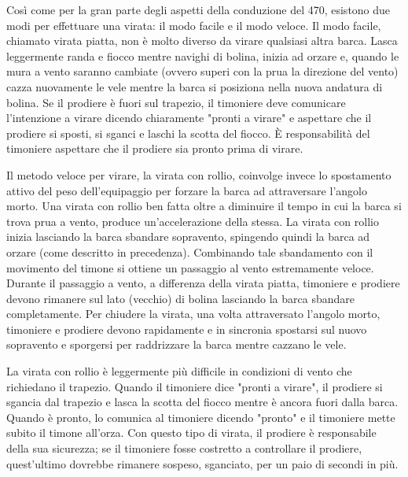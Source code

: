 Così come per la gran parte degli aspetti della conduzione del 470, esistono due
modi per effettuare una virata: il modo facile e il modo veloce. Il modo facile,
chiamato virata piatta, non è molto diverso da virare qualsiasi altra barca.
Lasca leggermente randa e fiocco mentre navighi di bolina, inizia ad orzare e,
quando le mura a vento saranno cambiate (ovvero superi con la prua la direzione
del vento) cazza nuovamente le vele mentre la barca si posiziona nella nuova
andatura di bolina. Se il prodiere è fuori sul trapezio, il timoniere deve
comunicare l'intenzione a virare dicendo chiaramente  "pronti a virare" e
aspettare che il prodiere si sposti, si sganci e laschi la scotta del fiocco. È
responsabilità del timoniere aspettare che il prodiere sia pronto prima di
virare.

Il metodo veloce per virare, la virata con rollio, coinvolge invece lo
spostamento attivo del peso dell'equipaggio per forzare la barca ad attraversare
l'angolo morto. Una virata con rollio ben fatta oltre a diminuire il tempo in
cui la barca si trova prua a vento, produce un'accelerazione della stessa. La
virata con rollio inizia lasciando la barca sbandare sopravento, spingendo
quindi la barca ad orzare (come descritto in precedenza). Combinando tale
sbandamento con il movimento del timone si ottiene un passaggio al vento
estremamente veloce. Durante il passaggio a vento, a differenza della virata
piatta, timoniere e prodiere devono rimanere sul lato (vecchio) di bolina
lasciando la barca sbandare completamente. Per chiudere la virata, una volta
attraversato l'angolo morto, timoniere e prodiere devono rapidamente e in
sincronia spostarsi sul nuovo sopravento e sporgersi per raddrizzare la barca
mentre cazzano le vele.

La virata con rollio è leggermente più difficile in condizioni di vento che
richiedano il trapezio. Quando il timoniere dice "pronti a virare", il prodiere
si sgancia dal trapezio e lasca la scotta del fiocco mentre è ancora fuori dalla
barca. Quando è pronto, lo comunica al timoniere dicendo "pronto" e il timoniere
mette subito il timone all'orza. Con questo tipo di virata, il prodiere è
responsabile della sua sicurezza; se il timoniere fosse costretto a controllare
il prodiere, quest'ultimo dovrebbe rimanere sospeso, sganciato, per un paio di
secondi in più.

